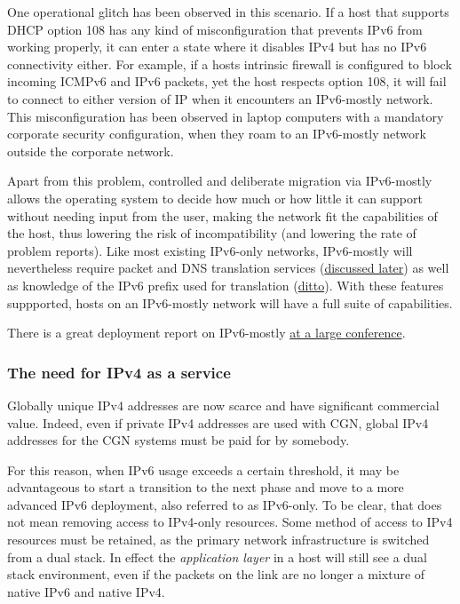 \documentclass[
]{article}
\begin{document}
One operational glitch has been observed in this scenario. If a host
that supports DHCP option 108 has any kind of misconfiguration that
prevents IPv6 from working properly, it can enter a state where it
disables IPv4 but has no IPv6 connectivity either. For example, if a
host\textquotesingle s intrinsic firewall is configured to block
incoming ICMPv6 and IPv6 packets, yet the host respects option 108, it
will fail to connect to either version of IP when it encounters an
IPv6-mostly network. This misconfiguration has been observed in laptop
computers with a mandatory corporate security configuration, when they
roam to an IPv6-mostly network outside the corporate network.

Apart from this problem, controlled and deliberate migration via
IPv6-mostly allows the operating system to decide how much or how little
it can support without needing input from the user, making the network
fit the capabilities of the host, thus lowering the risk of
incompatibility (and lowering the rate of problem reports). Like most
existing IPv6-only networks, IPv6-mostly will nevertheless require
packet and DNS translation services
(\hyperref[translation-and-ipv4-as-a-service]{discussed later}) as well
as knowledge of the IPv6 prefix used for translation
(\hyperref[translation-and-ipv4-as-a-service]{ditto}). With these
features suppported, hosts on an IPv6-mostly network will have a full
suite of capabilities.

There is a great deployment report on IPv6-mostly
\href{https://nsrc.org/blog/apricot-ipv6-only}{at a large conference}.

\subsubsection{The need for IPv4 as a
service}\label{the-need-for-ipv4-as-a-service}

Globally unique IPv4 addresses are now scarce and have significant
commercial value. Indeed, even if private IPv4 addresses are used with
CGN, global IPv4 addresses for the CGN systems must be paid for by
somebody.

For this reason, when IPv6 usage exceeds a certain threshold, it may be
advantageous to start a transition to the next phase and move to a more
advanced IPv6 deployment, also referred to as IPv6-only. To be clear,
that does not mean removing access to IPv4-only resources. Some method
of access to IPv4 resources must be retained, as the primary network
infrastructure is switched from a dual stack. In effect the
\emph{application layer} in a host will still see a dual stack
environment, even if the packets on the link are no longer a mixture of
native IPv6 and native IPv4.
\end{document}
